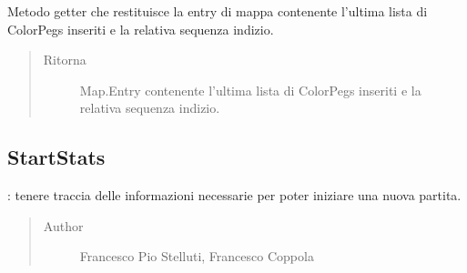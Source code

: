 \documentclass[letterpaper,10pt,italian,openany,oneside]{sphinxmanual}
\begin{document}
\begin{fulllineitems}
\label{\detokenize{source/it/unicam/cs/pa/mastermind/ui/InteractionView:it.unicam.cs.pa.mastermind.ui.InteractionView.getLastAttemptAndClue()}}
Metodo getter che restituisce la entry di mappa contenente l’ultima lista di ColorPegs inseriti e la relativa sequenza indizio.
\begin{quote}\begin{description}
\item[{Ritorna}] \leavevmode
Map.Entry contenente l’ultima lista di ColorPegs inseriti e la relativa sequenza indizio.

\end{description}\end{quote}

\end{fulllineitems}



\subsection{StartStats}
\label{\detokenize{source/it/unicam/cs/pa/mastermind/ui/StartStats:startstats}}\label{\detokenize{source/it/unicam/cs/pa/mastermind/ui/StartStats::doc}}

\begin{fulllineitems}
\label{\detokenize{source/it/unicam/cs/pa/mastermind/ui/StartStats:it.unicam.cs.pa.mastermind.ui.StartStats}}
: tenere traccia delle informazioni necessarie per poter iniziare una nuova partita.
\begin{quote}\begin{description}
\item[{Author}] \leavevmode
Francesco Pio Stelluti, Francesco Coppola

\end{description}\end{quote}

\end{fulllineitems}
\end{document}
